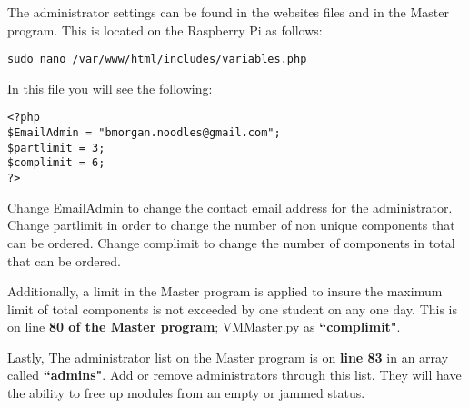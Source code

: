 \documentclass[a4paper,11pt]{article}
\numberwithin{figure}{section}
\numberwithin{table}{section}
\begin{document}
\begin{appendices}
The administrator settings can be found in the websites files and in the Master program. This is located on the Raspberry Pi as follows:
\begin{lstlisting}
sudo nano /var/www/html/includes/variables.php
\end{lstlisting}
In this file you will see the following:
\begin{lstlisting}
<?php
$EmailAdmin = "bmorgan.noodles@gmail.com";
$partlimit = 3;
$complimit = 6;
?>
\end{lstlisting}
Change EmailAdmin to change the contact email address for the administrator. Change partlimit in order to change the number of non unique components that can be ordered. Change complimit to change the number of components in total that can be ordered.

Additionally, a limit in the Master program is applied to insure the maximum limit of total components is not exceeded by one student on any one day. This is on line \textbf{80 of the Master program}; VMMaster.py as \textbf{``complimit"}.

Lastly, The administrator list on the Master program is on \textbf{line 83} in an array called \textbf{``admins"}. Add or remove administrators through this list. They will have the ability to free up modules from an empty or jammed status.



\end{appendices}
\end{document}
